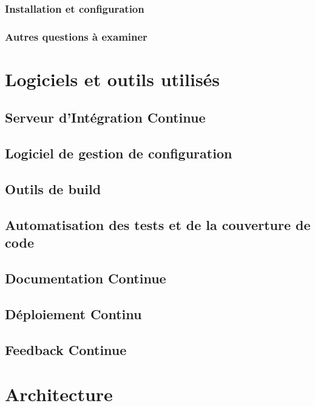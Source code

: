 \documentclass{report}
\begin{document}
          \subsubsection{Installation et configuration}

          \subsubsection{Autres questions à examiner}

      \section{Logiciels et outils utilisés}

        \subsection{Serveur d’Intégration Continue}

        \subsection{Logiciel de gestion de configuration}

        \subsection{Outils de build}

        \subsection{Automatisation des tests et de la couverture de code}

        \subsection{Documentation Continue}

        \subsection{Déploiement Continu}

        \subsection{Feedback Continue}

      \section{Architecture}
\end{document}

